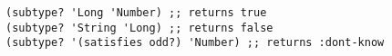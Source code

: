 \begin{lstlisting}[style=reclojureClojure]
(subtype? 'Long 'Number) ;; returns true
(subtype? 'String 'Long) ;; returns false
(subtype? '(satisfies odd?) 'Number) ;; returns :dont-know
\end{lstlisting}
